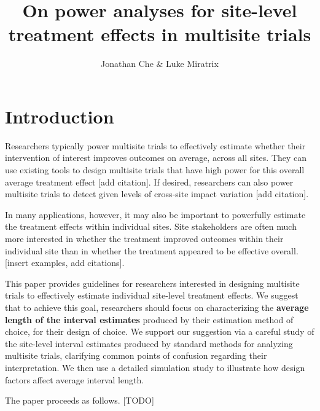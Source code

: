 \documentclass[]{article}
\title{On power analyses for site-level treatment effects in multisite trials}
\author{Jonathan Che \& Luke Miratrix}
\begin{document}
\maketitle


\section{Introduction}

Researchers typically power multisite trials to effectively estimate whether their intervention of interest improves outcomes on average, across all sites.
They can use existing tools to design multisite trials that have high power for this overall average treatment effect [add citation].
If desired, researchers can also power multisite trials to detect given levels of cross-site impact variation [add citation].

In many applications, however, it may also be important to powerfully estimate the treatment effects within individual sites.
Site stakeholders are often much more interested in whether the treatment improved outcomes within their individual site than in whether the treatment appeared to be effective overall.
[insert examples, add citations].

This paper provides guidelines for researchers interested in designing multisite trials to effectively estimate individual site-level treatment effects.
We suggest that to achieve this goal, researchers should focus on characterizing the \textbf{average length of the interval estimates} produced by their estimation method of choice, for their design of choice.
We support our suggestion via a careful study of the site-level interval estimates produced by standard methods for analyzing multisite trials, clarifying common points of confusion regarding their interpretation.
We then use a detailed simulation study to illustrate how design factors affect average interval length.

The paper proceeds as follows.
[TODO]
\end{document}
